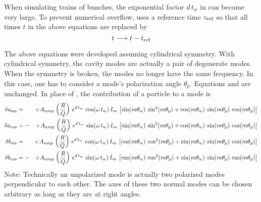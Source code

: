 When simulating trains of bunches, the exponential factor $d \, t_w$ in  can
become very large. To prevent numerical overflow, \bmad uses a reference time $z_{\text{ref}}$ so
that all times $t$ in the above equations are replaced by
\begin{equation}
  t \longrightarrow t - t_{\text{ref}}
  \label{ttt}
\end{equation}

The above equations were developed assuming cylindrical symmetry. With cylindrical symmetry, the
cavity modes are actually a pair of degenerate modes. When the symmetry is broken, the modes no
longer have the same frequency. In this case, one has to consider a mode's polarization angle
$\theta_p$. Equations  and  are unchanged.  In place of , the
contribution of a particle to a mode is
\begin{alignat}{2}
  \delta a_{\sin} &=  & c \, A_{amp} \, \left( \frac{R}{Q} \right) \,
    e^{d \, t_w} \, \cos (\omega \, t_w) \, I_m \, \left[
    \sin(m \theta_w) \, \sin^2(m \theta_p) + 
    \cos(m \theta_w) \, \sin(m \theta_p) \, \cos(m\theta_p) \right]
    \nonumber \\
  \delta a_{\cos} &= -& c \, A_{amp} \, \left( \frac{R}{Q} \right) \,
    e^{d \, t_w} \, \sin (\omega \, t_w) \, I_m \, \left[ 
    \sin(m \theta_w) \, \sin^2(m \theta_p) + 
    \cos(m \theta_w) \, \sin(m \theta_p) \, \cos(m\theta_p) \right]
    \\
  \delta b_{\sin} &=  & c \, A_{amp} \, \left( \frac{R}{Q} \right) \,
    e^{d \, t_w} \, \cos (\omega \, t_w) \, I_m \, \left[
    \cos(m \theta_w) \, \cos^2(m \theta_p) + 
    \sin(m \theta_w) \, \sin(m \theta_p) \, \cos(m\theta_p) \right]
    \nonumber \\
  \delta b_{\cos} &= -& c \, A_{amp} \, \left( \frac{R}{Q} \right) \,
    e^{d \, t_w} \, \sin (\omega \, t_w) \, I_m \, \left[
    \cos(m \theta_w) \, \cos^2(m \theta_p) + 
    \sin(m \theta_w) \, \sin(m \theta_p) \, \cos(m\theta_p) \right]
    \nonumber
\end{alignat}
Note: Technically an unpolarized mode is actually two polarized modes perpendicular to each
other. The axes of these two normal modes can be chosen arbitrary as long as they are at
right angles.
